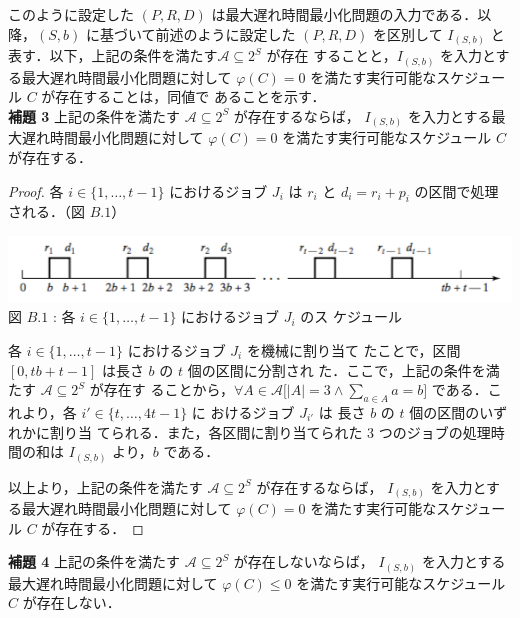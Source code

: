 \documentclass[12pt]{optlab-bachelor}
\begin{document}
このように設定した $(P,R,D)$ は最大遅れ時間最小化問題の入力である．以
降，$(S,b)$ に基づいて前述のように設定した $(P,R,D)$ を区別して
$I_{(S,b)}$ と表す．以下，上記の条件を満たす$\mathcal{A} \subseteq 2^S$ が存在
することと，$I_{(S,b)}$ を入力とする最大遅れ時間最小化問題に対して
$\varphi(C) =  0$
を満たす実行可能なスケジュール $C$ が存在することは，同値で
あることを示す．\\

\noindent \textbf{補題 3}
上記の条件を満たす $\mathcal{A} \subseteq 2^S$ が存在するならば，
$I_{(S,b)}$ を入力とする最大遅れ時間最小化問題に対して $\varphi(C) =
0$ を満たす実行可能なスケジュール $C$ が存在する．\\

\begin{proof}
  各 $i \in \{1,\ldots,t - 1\}$ におけるジョブ $J_i$ は $r_i$ と $d_i =
  r_i + p_i$ の区間で処理される．（図 $B.1$）
  \begin{center}
    \includegraphics[width = 15cm]{Lmax1.png} \\
    図 $B.1$ : 各 $i \in \{1,\ldots,t - 1\}$ におけるジョブ $J_i$ のス
    ケジュール
  \end{center}
  各 $i \in \{1,\ldots,t - 1\}$ におけるジョブ $J_i$ を機械に割り当て
  たことで，区間 $[0,tb + t - 1]$ は長さ $b$ の $t$ 個の区間に分割され
  た．ここで，上記の条件を満たす $\mathcal{A} \subseteq 2^S$ が存在す
  ることから，$\forall A \in \mathcal{A}\big[|A| = 3 \land \sum_{a \in
    A}a = b \big]$ である．これより，各 $i' \in \{t,\ldots,4t - 1\}$ に
  おけるジョブ $J_{i'}$ は 長さ $b$ の $t$ 個の区間のいずれかに割り当
  てられる．また，各区間に割り当てられた 3 つのジョブの処理時間の和は
  $I_{(S,b)}$ より，$b$ である．
  
  以上より，上記の条件を満たす $\mathcal{A} \subseteq 2^S$ が存在するならば，
  $I_{(S,b)}$ を入力とする最大遅れ時間最小化問題に対して $\varphi(C) =
  0$ を満たす実行可能なスケジュール $C$ が存在する．
\end{proof}

\noindent \textbf{補題 4}
上記の条件を満たす $\mathcal{A} \subseteq 2^S$ が存在しないならば，
$I_{(S,b)}$ を入力とする最大遅れ時間最小化問題に対して $\varphi(C) \le
0$ を満たす実行可能なスケジュール $C$ が存在しない．\\
\end{document}
